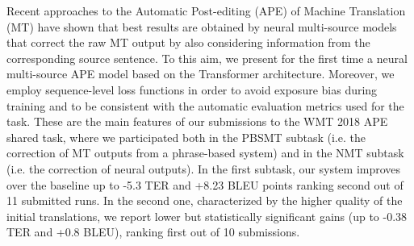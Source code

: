 Recent approaches to the Automatic Post-editing (APE) of Machine Translation (MT)  have shown that best results are obtained by neural multi-source models that correct the raw MT output by also considering information from the corresponding source sentence. To this aim, we present for the first time a neural multi-source APE model based on the Transformer architecture. Moreover, we employ sequence-level loss functions in order to avoid exposure bias during training and to be consistent with the automatic evaluation metrics used for the task. These are the main features of our submissions to the WMT 2018 APE shared task, where we participated both in the PBSMT subtask (i.e. the correction of MT outputs from a phrase-based system) and in the NMT subtask (i.e. the correction of neural outputs). In the first subtask, our system improves over the baseline up to -5.3 TER and +8.23 BLEU points ranking second out of 11 submitted runs. In the second one, characterized by the higher quality of the initial translations, we report lower but statistically significant gains (up to -0.38 TER and +0.8 BLEU), ranking first out of 10 submissions.

